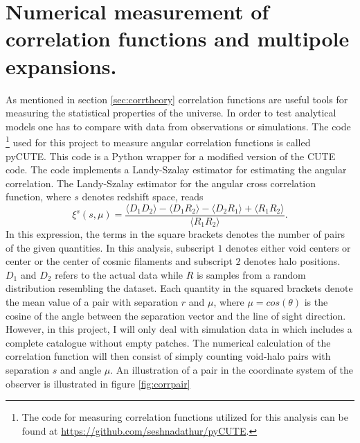\section{Numerical measurement of correlation functions and multipole expansions.}\label{sec:numerical_corr}
As mentioned in section \ref{sec:corrtheory} correlation functions are useful
tools for measuring the statistical properties of the universe. In order to test
analytical models one has to compare with data from observations or simulations.
The code \footnote{The code for measuring correlation functions utilized for this analysis can be found at \url{https://github.com/seshnadathur/pyCUTE}.} used for this project to measure angular correlation functions
is called pyCUTE. This code is a Python wrapper for a modified version of the CUTE\cite{alonso2013cute} code. The code implements a Landy-Szalay estimator \cite{Landy} for estimating the angular correlation. The Landy-Szalay estimator
for the angular cross correlation function, where $s$ denotes redshift space, reads
\begin{equation}
    \xi^s(s,\mu)=\frac{\langle D_1D_2\rangle-\langle D_1R_2\rangle-\langle D_2R_1\rangle+\langle R_1R_2\rangle}{\langle R_1R_2\rangle}.
\end{equation}
In this expression, the terms in the square brackets denotes the number of pairs of the given quantities. In this analysis, subscript $1$ denotes either void centers or center or
the center of cosmic filaments and subscript $2$ denotes halo positions. $D_1$
and $D_2$ refers to the actual data while $R$ is samples from a random
distribution resembling the dataset. Each quantity in the squared brackets
denote the mean value of a pair with separation $r$ and $\mu$, where
$\mu=cos(\theta)$ is the cosine of the angle between the separation vector and
the line of sight direction. However, in this project, I will only deal with simulation data in which includes a complete catalogue without empty patches.
The numerical calculation of the correlation function will then consist of simply counting void-halo pairs with separation $s$ and angle $\mu$.
An illustration of a pair in the coordinate system
of the observer is illustrated in figure \ref{fig:corrpair}
